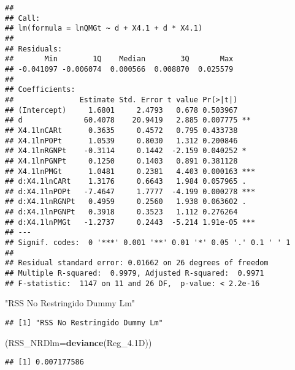\documentclass[
]{article}
\newenvironment{Shaded}{\begin{snugshade}}{\end{snugshade}}
\newcommand{\DataTypeTok}[1]{\textcolor[rgb]{0.13,0.29,0.53}{#1}}
\newcommand{\FloatTok}[1]{\textcolor[rgb]{0.00,0.00,0.81}{#1}}
\newcommand{\KeywordTok}[1]{\textcolor[rgb]{0.13,0.29,0.53}{\textbf{#1}}}
\newcommand{\NormalTok}[1]{#1}
\newcommand{\StringTok}[1]{\textcolor[rgb]{0.31,0.60,0.02}{#1}}
\begin{document}
\begin{verbatim}
## 
## Call:
## lm(formula = lnQMGt ~ d + X4.1 + d * X4.1)
## 
## Residuals:
##       Min        1Q    Median        3Q       Max 
## -0.041097 -0.006074  0.000566  0.008870  0.025579 
## 
## Coefficients:
##               Estimate Std. Error t value Pr(>|t|)    
## (Intercept)     1.6801     2.4793   0.678 0.503967    
## d              60.4078    20.9419   2.885 0.007775 ** 
## X4.1lnCARt      0.3635     0.4572   0.795 0.433738    
## X4.1lnPOPt      1.0539     0.8030   1.312 0.200846    
## X4.1lnRGNPt    -0.3114     0.1442  -2.159 0.040252 *  
## X4.1lnPGNPt     0.1250     0.1403   0.891 0.381128    
## X4.1lnPMGt      1.0481     0.2381   4.403 0.000163 ***
## d:X4.1lnCARt    1.3176     0.6643   1.984 0.057965 .  
## d:X4.1lnPOPt   -7.4647     1.7777  -4.199 0.000278 ***
## d:X4.1lnRGNPt   0.4959     0.2560   1.938 0.063602 .  
## d:X4.1lnPGNPt   0.3918     0.3523   1.112 0.276264    
## d:X4.1lnPMGt   -1.2737     0.2443  -5.214 1.91e-05 ***
## ---
## Signif. codes:  0 '***' 0.001 '**' 0.01 '*' 0.05 '.' 0.1 ' ' 1
## 
## Residual standard error: 0.01662 on 26 degrees of freedom
## Multiple R-squared:  0.9979, Adjusted R-squared:  0.9971 
## F-statistic:  1147 on 11 and 26 DF,  p-value: < 2.2e-16
\end{verbatim}

\begin{Shaded}
\begin{Highlighting}[]
\StringTok{"RSS No Restringido Dummy Lm"}
\end{Highlighting}
\end{Shaded}

\begin{verbatim}
## [1] "RSS No Restringido Dummy Lm"
\end{verbatim}

\begin{Shaded}
\begin{Highlighting}[]
\NormalTok{(}\DataTypeTok{RSS_NRDlm=}\KeywordTok{deviance}\NormalTok{(Reg_}\FloatTok{4.1}\NormalTok{D))}
\end{Highlighting}
\end{Shaded}

\begin{verbatim}
## [1] 0.007177586
\end{verbatim}
\end{document}
